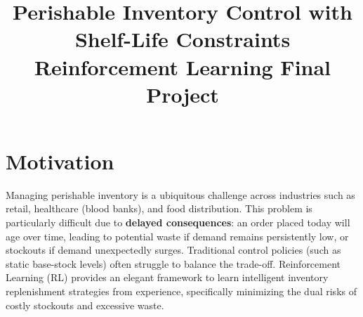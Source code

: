 \documentclass{article}
\title{Perishable Inventory Control with Shelf-Life Constraints\\ \large Reinforcement Learning Final Project}
\author{}
\date{}
\begin{document}
\maketitle

\section{Motivation}
Managing perishable inventory is a ubiquitous challenge across industries such as retail, healthcare (blood banks), and food distribution. This problem is particularly difficult due to \textbf{delayed consequences}: an order placed today will age over time, leading to potential waste if demand remains persistently low, or stockouts if demand unexpectedly surges. Traditional control policies (such as static base-stock levels) often struggle to balance the trade-off. 
Reinforcement Learning (RL) provides an elegant framework to learn intelligent inventory replenishment strategies from experience, specifically minimizing the dual risks of costly stockouts and excessive waste.
\end{document}
